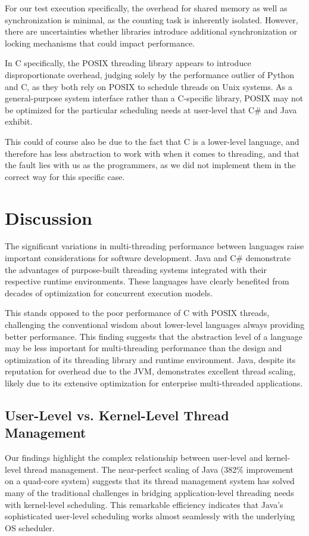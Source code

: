 \documentclass[12pt,a4paper]{article}
\begin{document}
For our test execution specifically, the overhead for shared memory as well as synchronization is minimal, as the counting task is inherently isolated. However, there are uncertainties whether libraries introduce additional synchronization or locking mechanisms that could impact performance.

In C specifically, the POSIX threading library appears to introduce disproportionate overhead, judging solely by the performance outlier of Python and C, as they both rely on POSIX to schedule threads on Unix systems. As a general-purpose system interface rather than a C-specific library, POSIX may not be optimized for the particular scheduling needs at user-level that C\# and Java exhibit.

This could of course also be due to the fact that C is a lower-level language, and therefore has less abstraction to work with when it comes to threading, and that the fault lies with us as the programmers, as we did not implement them in the correct way for this specific case. 

\section{Discussion}

The significant variations in multi-threading performance between languages raise important considerations for software development. Java and C\# demonstrate the advantages of purpose-built threading systems integrated with their respective runtime environments. These languages have clearly benefited from decades of optimization for concurrent execution models.

This stands opposed to the poor performance of C with POSIX threads, challenging the conventional wisdom about lower-level languages always providing better performance. This finding suggests that the abstraction level of a language may be less important for multi-threading performance than the design and optimization of its threading library and runtime environment. Java, despite its reputation for overhead due to the JVM, demonstrates excellent thread scaling, likely due to its extensive optimization for enterprise multi-threaded applications.

\subsection{User-Level vs. Kernel-Level Thread Management}

Our findings highlight the complex relationship between user-level and kernel-level thread management. The near-perfect scaling of Java (382\% improvement on a quad-core system) suggests that its thread management system has solved many of the traditional challenges in bridging application-level threading needs with kernel-level scheduling. This remarkable efficiency indicates that Java's sophisticated user-level scheduling works almost seamlessly with the underlying OS scheduler.
\end{document}

